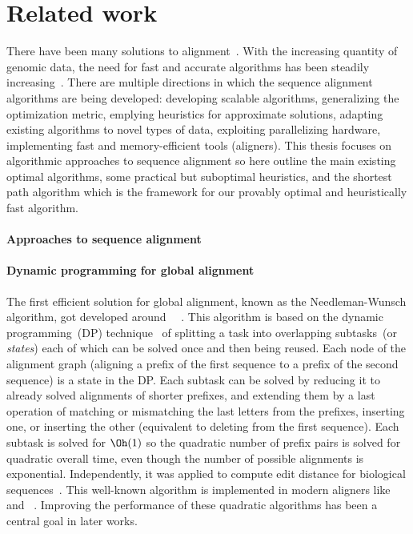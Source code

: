 \section*{Related work}

There have been many solutions to alignment~\citep{navarro2001guided}. With the
increasing quantity of genomic data, the need for fast and accurate algorithms
has been steadily increasing~\cite{alser2021technology}. There are multiple
directions in which the sequence alignment algorithms are being developed:
developing scalable algorithms, generalizing the optimization metric, emplying
heuristics for approximate solutions, adapting existing algorithms to novel
types of data, exploiting parallelizing hardware, implementing fast and
memory-efficient tools (aligners). This thesis focuses on algorithmic approaches
to sequence alignment so here outline the main existing optimal algorithms, some
practical but suboptimal heuristics, and the \A shortest path algorithm which is
the framework for our provably optimal and heuristically fast algorithm.

\paragraph{Approaches to sequence alignment}

\paragraph{Dynamic programming for global alignment}
The first efficient solution for global alignment, known as the Needleman-Wunsch
algorithm, got developed around~\citeyear{vintsyuk1968speech}~
\cite{vintsyuk1968speech,needleman1970general}. This algorithm is based on the
dynamic programming~(DP) technique~\cite{bellman1954theory} of splitting a task
into overlapping subtasks~(or \emph{states}) each of which can be solved once
and then being reused. Each node of the alignment graph (aligning a prefix of
the first sequence to a prefix of the second sequence) is a state in the DP.
Each subtask can be solved by reducing it to already solved alignments of
shorter prefixes, and extending them by a last operation of matching or
mismatching the last letters from the prefixes, inserting one, or inserting the
other (equivalent to deleting from the first sequence). Each subtask is solved
for $\Oh(1)$ so the quadratic number of prefix pairs is solved for quadratic
overall time, even though the number of possible alignments is exponential.
Independently, it was applied to compute edit distance for biological
sequences~\citep{needleman1970general,sankoff1972matching,sellers1974theory,wagner1974string}.
This well-known algorithm is implemented in modern aligners  like
\seqan~\citep{reinert2017seqan} and \parasail~\citep{daily2016parasail}.
Improving the performance of these quadratic algorithms has been a central goal
in later works.

